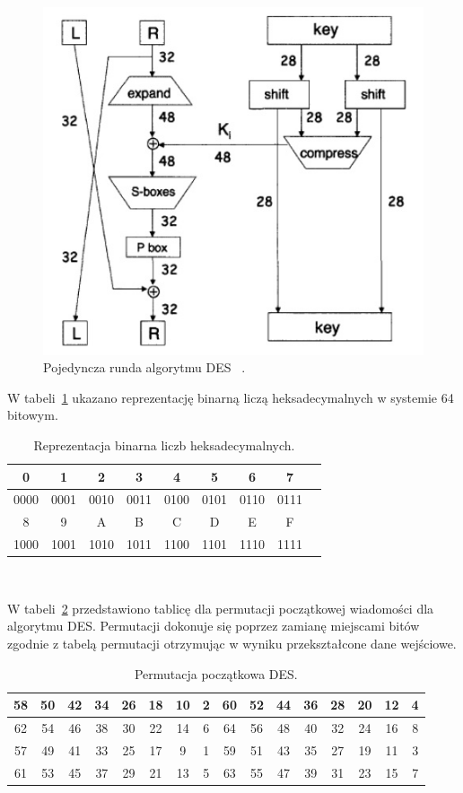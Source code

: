 \documentclass[12p]{article}
\begin{document}
\begin{figure}[H]
\centering
\includegraphics{des}
\caption{Pojedyncza runda algorytmu DES ~\cite{DES}.
}\label{des}
\end{figure}

W tabeli~\ref{hex_to_bin} ukazano reprezentację binarną liczą heksadecymalnych w systemie 64 bitowym.

\begin{table}[H]
\centering
\begin{tabular}{|c|c|c|c|c|c|c|c|c|}
\hline
0 & 1 & 2 & 3 & 4 & 5 & 6 & 7\\
\hline
0000 & 0001 & 0010 & 0011 & 0100 & 0101 & 0110 & 0111\\
\hline
8 & 9 & A & B & C & D & E & F\\
\hline
1000 & 1001 & 1010 & 1011 & 1100 & 1101 & 1110 & 1111\\
\hline
\end{tabular}
\caption{Reprezentacja binarna liczb heksadecymalnych.}~\label{hex_to_bin}
\end{table}
\newpage
W tabeli~\ref{per_poczatkowa} przedstawiono tablicę dla permutacji początkowej wiadomości dla algorytmu DES. Permutacji dokonuje się poprzez zamianę miejscami bitów zgodnie z tabelą permutacji otrzymując w wyniku przekształcone dane wejściowe.

\begin{table}[H]
\centering
\begin{tabular}{|c|c|c|c|c|c|c|c|c|c|c|c|c|c|c|c|}
\hline
58 & 50 & 42 & 34 & 26 & 18 & 10 & 2 & 60 & 52 & 44 & 36 & 28 & 20 & 12 & 4\\
\hline
62 & 54 & 46 & 38 & 30 & 22 & 14 & 6 & 64 & 56 & 48 & 40 & 32 & 24 & 16 & 8\\
\hline
57 & 49 & 41 & 33 & 25 & 17 & 9 & 1 & 59 & 51 & 43 & 35 & 27 & 19 & 11 & 3\\
\hline
61 & 53 & 45 & 37 & 29 & 21 & 13 & 5 & 63 & 55 & 47 & 39 & 31 & 23 & 15 & 7\\
\hline
\end{tabular}
\caption{Permutacja początkowa DES.}\label{per_poczatkowa}
\end{table}
\end{document}
